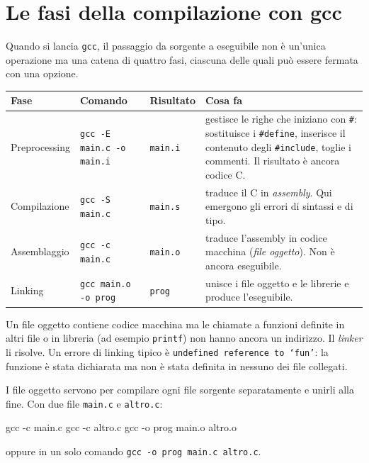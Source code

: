 \documentclass[11pt,a4paper]{article}
\begin{document}
\section{Le fasi della compilazione con gcc}

Quando si lancia \lstinline|gcc|, il passaggio da sorgente a eseguibile non è
un'unica operazione ma una catena di quattro fasi, ciascuna delle quali può
essere fermata con una opzione.

\begin{center}
\small
\renewcommand{\arraystretch}{1.25}
\begin{tabular}{@{}l l l p{5.6cm}@{}}
\toprule
\textbf{Fase} & \textbf{Comando} & \textbf{Risultato} & \textbf{Cosa fa} \\
\midrule
Preprocessing & \lstinline|gcc -E main.c -o main.i| & \texttt{main.i} &
  gestisce le righe che iniziano con \lstinline|#|: sostituisce i
  \lstinline|#define|, inserisce il contenuto degli \lstinline|#include|,
  toglie i commenti. Il risultato è ancora codice C. \\
Compilazione & \lstinline|gcc -S main.c| & \texttt{main.s} &
  traduce il C in \emph{assembly}. Qui emergono gli errori di sintassi e di
  tipo. \\
Assemblaggio & \lstinline|gcc -c main.c| & \texttt{main.o} &
  traduce l'assembly in codice macchina (\emph{file oggetto}). Non è ancora
  eseguibile. \\
Linking & \lstinline|gcc main.o -o prog| & \texttt{prog} &
  unisce i file oggetto e le librerie e produce l'eseguibile. \\
\bottomrule
\end{tabular}
\end{center}

\begin{osservazione}
Un file oggetto contiene codice macchina ma le chiamate a funzioni definite in
altri file o in libreria (ad esempio \lstinline|printf|) non hanno ancora un
indirizzo. Il \emph{linker} li risolve. Un errore di linking tipico è
\texttt{undefined reference to `fun'}: la funzione è stata dichiarata ma non
è stata definita in nessuno dei file collegati.
\end{osservazione}

I file oggetto servono per compilare ogni file sorgente separatamente e unirli
alla fine. Con due file \texttt{main.c} e \texttt{altro.c}:
\begin{comando}
gcc -c main.c
gcc -c altro.c
gcc -o prog main.o altro.o
\end{comando}
oppure in un solo comando \lstinline|gcc -o prog main.c altro.c|.
\end{document}
